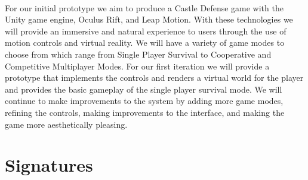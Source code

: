 \paragraph{} For our initial prototype we aim to produce a Castle Defense game with the Unity game engine, Oculus Rift, and Leap Motion. With these technologies we will provide an immersive and natural experience to users through the use of motion controls and virtual reality. We will have a variety of game modes to choose from which range from Single Player Survival to Cooperative and Competitive Multiplayer Modes. For our first iteration we will provide a prototype that  implements the controls and renders a virtual world for the player and provides the basic gameplay of the single player survival mode. We will continue to make improvements to the system by adding more game modes, refining the controls, making improvements to the interface, and making the game more aesthetically pleasing.

\section{Signatures}

\noindent {}

